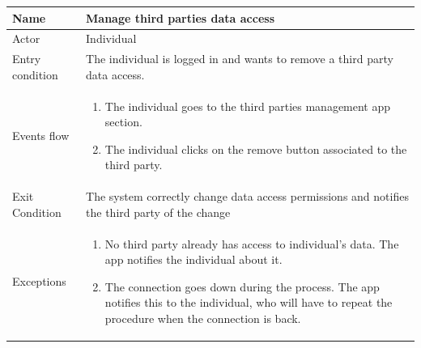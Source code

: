 \begin{tabular}{|l|p{11cm}|}
    \hline
    Name & Manage third parties data access
    \\ \hline
    Actor & Individual
    \\ \hline 
    Entry condition & The individual is logged in and wants to remove a third party data access.
        \\ \hline
    Events flow &
    \begin{enumerate}
	\item The individual goes to the third parties management app section.
    \item The individual clicks on the remove button associated to the third party.
    \end{enumerate}
     \\ \hline
     Exit Condition & The system correctly change data access permissions and notifies the third party of the change
     \\
    \hline
    Exceptions &
        \begin{enumerate}
    \item No third party already has access to individual's data. The app notifies the individual about it.
    \item The connection goes down during the process. The app notifies this to the individual, who will have to repeat the procedure when the connection is back.
    \end{enumerate}
       \\
    \hline
\end{tabular}



